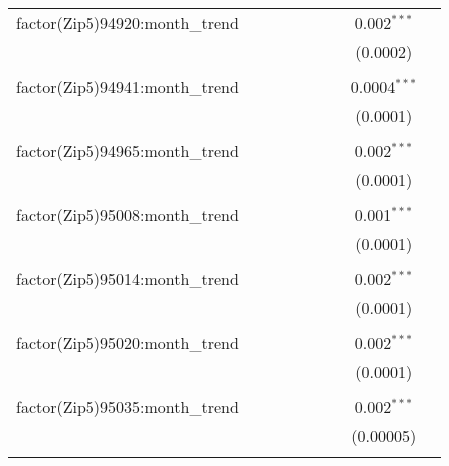 \begin{table}[H]
{\begin{tabular}{@{\extracolsep{5pt}}lcccccccc}
  factor(Zip5)94920:month\_trend &  &  &  &  &  &  & 0.002$^{***}$ &  \\  

   &  &  &  &  &  &  & (0.0002) &  \\  

   & & & & & & & & \\  

  factor(Zip5)94941:month\_trend &  &  &  &  &  &  & 0.0004$^{***}$ &  \\  

   &  &  &  &  &  &  & (0.0001) &  \\  

   & & & & & & & & \\  

  factor(Zip5)94965:month\_trend &  &  &  &  &  &  & 0.002$^{***}$ &  \\  

   &  &  &  &  &  &  & (0.0001) &  \\  

   & & & & & & & & \\  

  factor(Zip5)95008:month\_trend &  &  &  &  &  &  & 0.001$^{***}$ &  \\  

   &  &  &  &  &  &  & (0.0001) &  \\  

   & & & & & & & & \\  

  factor(Zip5)95014:month\_trend &  &  &  &  &  &  & 0.002$^{***}$ &  \\  

   &  &  &  &  &  &  & (0.0001) &  \\  

   & & & & & & & & \\  

  factor(Zip5)95020:month\_trend &  &  &  &  &  &  & 0.002$^{***}$ &  \\  

   &  &  &  &  &  &  & (0.0001) &  \\  

   & & & & & & & & \\  

  factor(Zip5)95035:month\_trend &  &  &  &  &  &  & 0.002$^{***}$ &  \\  

   &  &  &  &  &  &  & (0.00005) &  \\  

   & & & & & & & & \\  


\end{tabular}}
\end{table}
